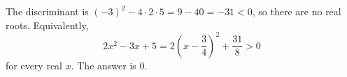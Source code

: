The discriminant is $(-3)^2-4\cdot2\cdot5=9-40=-31<0$, so there are no real roots. Equivalently,
\[
2x^2-3x+5=2\left(x-\dfrac{3}{4}\right)^2+\dfrac{31}{8}>0
\]
for every real $x$. The answer is $\boxed{0}$.
